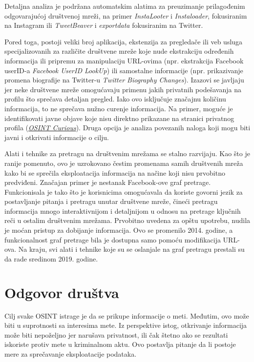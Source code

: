 \documentclass[fleqn, 12pt]{article}
\begin{document}
Detaljna analiza je podržana automatskim alatima za preuzimanje prilagođenim odgovarajućoj društvenoj mreži, na primer \textit{InstaLooter} i \textit{Instaloader}, fokusiranim na Instagram ili \textit{TweetBeaver} i \textit{exportdata} fokusiranim na Twitter.\newline

Pored toga, postoji veliki broj aplikacija, ekstenzija za pregledače ili veb usluga specijalizovanih za različite društvene mreže koje nude ekstrakciju određenih informacija ili pripremu za manipulaciju URL-ovima (npr. ekstrakcija Facebook userID-a \textit{Facebook UserID LookUp}) ili samostalne informacije (npr. prikazivanje promena biografije na Twitter-u \textit{Twitter Biography Changes}). Izazovi se javljaju jer neke društvene mreže omogućavaju primenu jakih privatnih podešavanja na profilu što sprečava detaljan pregled. Iako ovo isključuje značajnu količinu informacija, to ne sprečava nužno curenje informacija. Na primer, moguće je identifikovati javne objave koje nisu direktno prikazane na stranici privatnog profila (\textit{\href{https://www.osintcurio.us/}{OSINT Curious}}). Druga opcija je analiza povezanih naloga koji mogu biti javni i otkrivati informacije o cilju.\newline

Alati i tehnike za pretragu na društvenim mrežama se stalno razvijaju. Kao što je ranije pomenuto, ovo je uzrokovano čestim promenama samih društvenih mreža kako bi se sprečila eksploatacija informacija na načine koji nisu prvobitno predviđeni. Značajan primer je nestanak Facebook-ove graf pretrage. Funkcionisala je tako što je korisnicima omogućavala da koriste govorni jezik za postavljanje pitanja i pretragu unutar društvene mreže, čineći pretragu informacija mnogo interaktivnijom i detaljnijom u odnosu na pretrage ključnih reči u ostalim društvenim mrežama. Prvobitno uvedena za opštu upotrebu, nudila je moćan pristup za dobijanje informacija. Ovo se promenilo 2014. godine, a funkcionalnost graf pretrage bila je dostupna samo pomoću modifikacija URL-ova. Na kraju, svi alati i tehnike koje su se oslanjale na graf pretragu prestali su da rade sredinom 2019. godine.\newpage
\section{Odgovor društva}
Cilj svake OSINT istrage je da se prikupe informacije o meti. Međutim, ovo može biti u suprotnosti sa interesima mete. Iz perspektive istog, otkrivanje informacija može biti nepoželjno jer narušava privatnost, ili čak štetno ako se rezultati iskoriste protiv mete u kriminalnom aktu. Ovo postavlja pitanje da li postoje mere za sprečavanje eksploatacije podataka.
\end{document}

